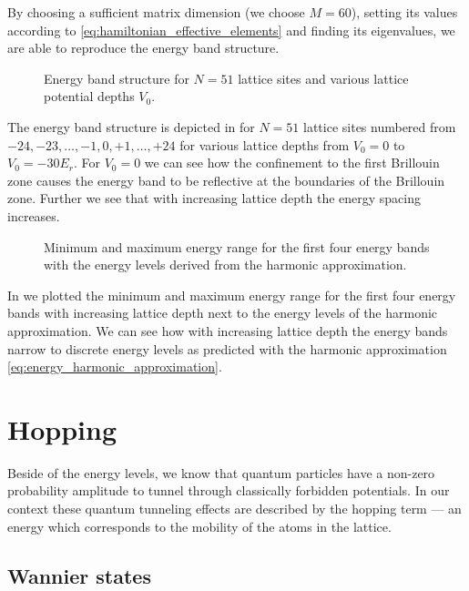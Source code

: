 By choosing a sufficient matrix dimension (we choose $M=60$), setting its
values according to \cref{eq:hamiltonian_effective_elements} and finding its
eigenvalues, we are able to reproduce the energy band structure.
\begin{figure}[htb]
  \centering
  \begin{adjustbox}{width=\textwidth}
    
  \end{adjustbox}
  \caption{Energy band structure for $N=51$ lattice sites and various lattice
    potential depths $V_0$.
  }\label{fig:scale_energy_structure}
\end{figure}
The energy band structure is depicted in 
for $N=51$ lattice sites numbered from $-24,-23,\dots,-1,0,+1,\dots,+24$
for various lattice depths from $V_0=0$ to $V_0=-30E_r$. For $V_0=0$ we can
see how the confinement to the first Brillouin zone causes the energy band to
be reflective at the boundaries of the Brillouin zone. Further we see that
with increasing lattice depth the energy spacing increases.
\begin{figure}[htb]
  \centering
  \begin{adjustbox}{width=\textwidth}
    
  \end{adjustbox}
  \caption{Minimum and maximum energy range for the first four energy bands
    with the energy levels derived from the harmonic approximation.
  }\label{fig:scale_energy}
\end{figure}
In  we plotted the minimum and maximum energy range
for the first four energy bands with increasing lattice depth next to the
energy levels of the harmonic approximation. We can see how with increasing
lattice depth the energy bands narrow to discrete energy levels as predicted
with the harmonic approximation \cref{eq:energy_harmonic_approximation}.

\section{Hopping}

Beside of the energy levels, we know that quantum particles have a non-zero
probability amplitude to tunnel through classically forbidden potentials. In
our context these quantum tunneling effects are described by the hopping term
--- an energy which corresponds to the mobility of the atoms in the lattice.

\subsection{Wannier states}

